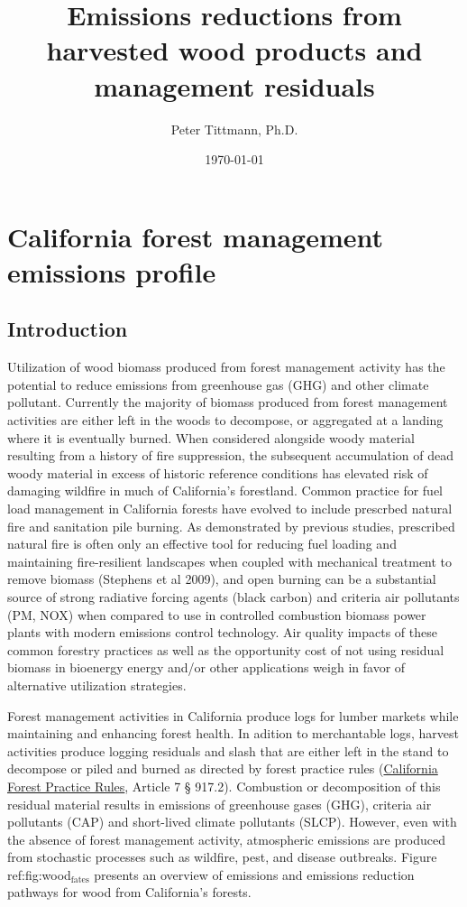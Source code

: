 \documentclass[a4paper]{article}
\author{Peter Tittmann, Ph.D.}
\date{\today}
\title{Emissions reductions from harvested wood products and management residuals}
\begin{document}
\maketitle
\tableofcontents

\pagebreak
\section{California forest management emissions profile}
\label{sec-1}
\subsection{Introduction}
\label{sec-1-1}

Utilization of wood biomass produced from forest management activity has the
potential to reduce emissions from greenhouse gas (GHG) and other climate
pollutant.  Currently the majority of biomass produced from forest
management activities are either left in the woods to decompose, or
aggregated at a landing where it is eventually burned. When considered alongside woody
material resulting from a history of fire suppression, the subsequent accumulation of dead
woody material in excess of historic reference conditions has
elevated risk of damaging wildfire in much of California's
forestland. Common practice for fuel load management in California forests have evolved to include prescrbed natural fire and sanitation pile burning.
As demonstrated by  previous studies, prescribed natural fire is often only an effective tool for reducing fuel loading and maintaining fire-resilient landscapes when coupled with mechanical treatment to remove biomass (Stephens et al 2009), and open burning can be a substantial source of strong radiative forcing agents (black carbon) and criteria air pollutants (PM, NOX) when compared to use in controlled combustion biomass power plants with modern emissions control technology.
Air quality impacts of these common forestry practices as well as the opportunity cost of not using residual biomass in bioenergy energy and/or other applications weigh in favor of alternative utilization strategies. 


Forest management activities in California produce logs for
lumber markets while maintaining and enhancing forest health.
In adition to merchantable logs, harvest activities produce logging residuals and slash that are either left
in the stand to decompose or piled and burned as directed by forest
practice rules (\href{http://calfire.ca.gov/resource_mgt/downloads/2013_FP_Rulebook_with_Tech_RuleNo1.pdf}{California Forest Practice Rules}, Article 7 §
917.2). Combustion or decomposition of this residual material results
in emissions of greenhouse gases (GHG), criteria air pollutants (CAP) and
short-lived climate pollutants (SLCP). However, even with the absence of forest management activity, atmospheric emissions are produced from stochastic processes such as wildfire, pest, and disease outbreaks. Figure ref:fig:wood$_{\text{fates}}$ presents an overview of emissions and emissions reduction pathways for wood from California's forests. 
\end{document}
